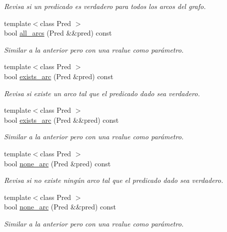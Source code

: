 \begin{DoxyCompactItemize}
\begin{DoxyCompactList}\small\item\em Revisa si un predicado es verdadero para todos los arcos del grafo. \end{DoxyCompactList}\item 
{\footnotesize template$<$class Pred $>$ }\\bool \hyperlink{class_designar_1_1_base_graph_aea71a873faf7e92195d582b21d14c347}{all\+\_\+arcs} (Pred \&\&pred) const
\begin{DoxyCompactList}\small\item\em Similar a la anterior pero con una rvalue como parámetro. \end{DoxyCompactList}\item 
{\footnotesize template$<$class Pred $>$ }\\bool \hyperlink{class_designar_1_1_base_graph_aaed186c42ed6b51f761cda959ecde601}{exists\+\_\+arc} (Pred \&pred) const
\begin{DoxyCompactList}\small\item\em Revisa si existe un arco tal que el predicado dado sea verdadero. \end{DoxyCompactList}\item 
{\footnotesize template$<$class Pred $>$ }\\bool \hyperlink{class_designar_1_1_base_graph_aebf517d972db553b03f2c4dbe4228d79}{exists\+\_\+arc} (Pred \&\&pred) const
\begin{DoxyCompactList}\small\item\em Similar a la anterior pero con una rvalue como parámetro. \end{DoxyCompactList}\item 
{\footnotesize template$<$class Pred $>$ }\\bool \hyperlink{class_designar_1_1_base_graph_a023f28dd8824ba7a0c26342effd0fddf}{none\+\_\+arc} (Pred \&pred) const
\begin{DoxyCompactList}\small\item\em Revisa si no existe ningún arco tal que el predicado dado sea verdadero. \end{DoxyCompactList}\item 
{\footnotesize template$<$class Pred $>$ }\\bool \hyperlink{class_designar_1_1_base_graph_a69c4841b8c517a510d738bc1204da7b7}{none\+\_\+arc} (Pred \&\&pred) const
\begin{DoxyCompactList}\small\item\em Similar a la anterior pero con una rvalue como parámetro. \end{DoxyCompactList}\item 

\end{DoxyCompactItemize}
